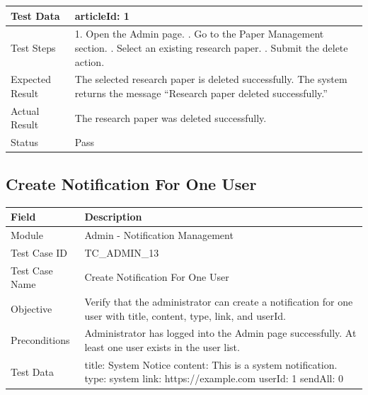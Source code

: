 \documentclass[12pt,a4paper]{article}
\begin{document}
{{\begin{longtable}{|p{4cm}|p{10cm}|}
	Test Data &
	articleId: 1
	\\ \hline
	
	Test Steps &
	1. Open the Admin page. \newline
	2. Go to the Paper Management section. \newline
	3. Select an existing research paper. \newline
	4. Submit the delete action.
	\\ \hline
	
	Expected Result &
	The selected research paper is deleted successfully. The system returns the message ``Research paper deleted successfully.'' \\ \hline
	
	Actual Result &
	The research paper was deleted successfully. \\ \hline
	
	Status & Pass \\ \hline
	
\end{longtable}
\subsection{Create Notification For One User}
\begin{longtable}{|p{4cm}|p{10cm}|}
	\hline
	\textbf{Field} & \textbf{Description} \\ \hline
	
	Module & Admin - Notification Management \\ \hline
	
	Test Case ID & TC\_ADMIN\_13 \\ \hline
	
	Test Case Name & Create Notification For One User \\ \hline
	
	Objective &
	Verify that the administrator can create a notification for one user with title, content, type, link, and userId. \\ \hline
	
	Preconditions &
	Administrator has logged into the Admin page successfully. \newline
	At least one user exists in the user list.
	\\ \hline
	
	Test Data &
	title: System Notice \newline
	content: This is a system notification. \newline
	type: system \newline
	link: https://example.com \newline
	userId: 1 \newline
	sendAll: 0
	\\ \hline
	

\end{longtable}}}
\end{document}
